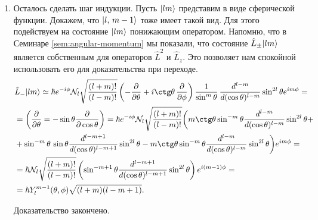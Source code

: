 \begin{enumerate}
\begin{align*}
          & = \hbar^2l(l+1)Y^l_l(\theta, \phi).
        \end{align*}
        Получилось как раз то, что нам нужно было: $\hat{L}^2 \ket{ll} = \lambda
          \ket{ll}$. Мы подтвердили базу индукции.
  \item Осталось сделать шаг индукции. Пусть $\lvert lm\rangle$ представим в виде сферической
        функции. Докажем, что $\lvert l,\, m-1\rangle$ тоже имеет такой вид. Для этого
        подействуем на состояние $\lvert lm\rangle$ понижающим оператором. Напомню, что в
        Семинаре \ref{sem:angular-momentum} мы показали, что состояние
        $\hat{L}_{\pm}\lvert lm\rangle$ является собственным для операторов $\hat{L}^2$ и
        $\hat{L}_z$. Это позволяет нам спокойной использовать его для доказательства
        при переходе.
        \begin{align*}
          &\hat{L}_-\ket{lm} \simeq \hbar e^{-i\phi}\mathcal{N}_l\sqrt{\frac{(l+m)!}{(l-m)!}}\left(-\pd{}{\theta} + i \ctg\theta\,\pd{}{\phi} \right)  \frac{1}{\sin^{m}\theta}\,\frac{d^{l-m}}{d(\cos\theta)^{l-m}}\sin^{2l}\theta e^{im\phi} = \\
          & = \left(\pd{}{\theta} =  -\sin\theta \pd{}{\cos\theta}\right) = \hbar e^{-i\phi} \mathcal{N}_l \sqrt{\frac{(l+m)!}{(l-m)!}} \biggl(m\ctg\theta\sin^{-m}\theta\frac{d^{l-m}}{d(\cos\theta)^{l-m}}\sin^{2l}\theta + \\
          & + \sin^{-m}\theta \, \sin\theta \frac{d^{l-m+1}}{d(\cos\theta)^{l-m+1}} \sin^{2l}\theta - m\ctg\theta\sin^{-m}\theta\frac{d^{l-m}}{d(\cos\theta)^{l-m}} \sin^{2l}\theta \biggl)e^{im\phi} = \\
          & = \hbar\mathcal{N}_l\sqrt{\frac{(l+m)!}{(l-m)!}} \left( \sin^{-m+1}\theta \frac{d^{l-m+1}}{d(\cos\theta)^{l-m+1}} \sin^{2l}\theta \right) e^{i (m-1) \phi} = \\
          & =\hbar Y^{m-1}_l(\theta, \phi)\sqrt{(l+m)(l-m+1)}.
        \end{align*}

        Доказательство закончено.
\end{enumerate}